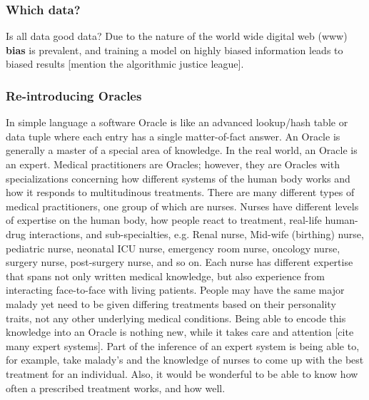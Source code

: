 \subsubsection{Which data?}
Is all data good data?
Due to the nature of the world wide digital web (www) \textbf{bias} is prevalent, and training a model on highly biased information leads to biased results [mention the algorithmic justice league].
\subsubsection{Re-introducing Oracles}
In simple language a software Oracle is like an advanced lookup/hash table or data tuple where each entry has a single matter-of-fact answer.
An Oracle is generally a master of a special area of knowledge.
In the real world, an Oracle is an expert.
Medical practitioners are Oracles; however, they are Oracles with specializations concerning how different systems of the human body works and how it responds to multitudinous treatments.
There are many different types of medical practitioners, one group of which are nurses.
Nurses have different levels of expertise on the human body, how people react to treatment, real-life human-drug interactions, and sub-specialties, e.g. Renal nurse, Mid-wife (birthing) nurse, pediatric nurse, neonatal ICU nurse, emergency room nurse, oncology nurse, surgery nurse, post-surgery nurse, and so on.
Each nurse has different expertise that spans not only written medical knowledge, but also experience from interacting face-to-face with living patients.
People may have the same major malady yet need to be given differing treatments based on their personality traits, not any other underlying medical conditions.
Being able to encode this knowledge into an Oracle is nothing new, while it takes care and attention [cite many expert systems].
Part of the inference of an expert system is being able to, for example, take malady's and the knowledge of nurses to come up with the best treatment for an individual.
Also, it would be wonderful to be able to know how often a prescribed treatment works, and how well.

\begin{comment}
Each nurse has undergone specialized training to become and expert and then learned thru practice.
In nursing practice there are many variables involved when discerning and providing treatment.
A model is fed with knowledge, like a nurse being trained, and the models' practice is interacting with experts and being told whether or not the answers it is giving are correct given the query.
\end{comment}